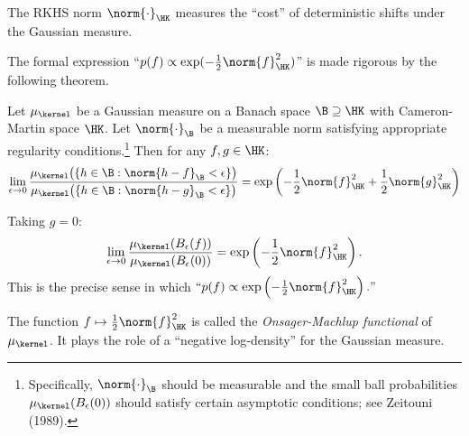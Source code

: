 \documentclass{article}
\begin{document}
\begin{corollary}
	The RKHS norm $\norm{\cdot}_{\HK}$ measures the ``cost'' of deterministic shifts under the Gaussian measure.
\end{corollary}


The formal expression ``$p(f) \propto \exp(-\frac{1}{2}\norm{f}_{\HK}^2)$'' is made rigorous by the following theorem.

\begin{theorem}
	\label{thm:onsager-machlup}
	Let $\mu_\kernel$ be a Gaussian measure on a Banach space $\B \supseteq \HK$ with Cameron-Martin space $\HK$. Let $\norm{\cdot}_{\B}$ be a measurable norm satisfying appropriate regularity conditions.\footnote{Specifically, $\norm{\cdot}_{\B}$ should be measurable and the small ball probabilities $\mu_\kernel(B_\epsilon(0))$ should satisfy certain asymptotic conditions; see Zeitouni (1989).} Then for any $f, g \in \HK$:
	\begin{equation}
		\lim_{\epsilon \to 0} \frac{\mu_\kernel\bigl(\{h \in \B : \norm{h - f}_{\B} < \epsilon\}\bigr)}{\mu_\kernel\bigl(\{h \in \B : \norm{h - g}_{\B} < \epsilon\}\bigr)} = \exp\left( -\frac{1}{2}\norm{f}_{\HK}^2 + \frac{1}{2}\norm{g}_{\HK}^2 \right)
	\end{equation}
\end{theorem}

\begin{corollary}
	Taking $g = 0$:
	\begin{equation}
		\lim_{\epsilon \to 0} \frac{\mu_\kernel(B_\epsilon(f))}{\mu_\kernel(B_\epsilon(0))} = \exp\left( -\frac{1}{2}\norm{f}_{\HK}^2 \right).
	\end{equation}
	This is the precise sense in which
	$
		``p(f) \propto \exp\left(-\frac{1}{2}\norm{f}_{\HK}^2\right)."
	$
\end{corollary}

\begin{remark}
	The function $f \mapsto \frac{1}{2}\norm{f}_{\HK}^2$ is called the \emph{Onsager-Machlup functional} of $\mu_\kernel$. It plays the role of a ``negative log-density'' for the Gaussian measure.
\end{remark}
\end{document}
